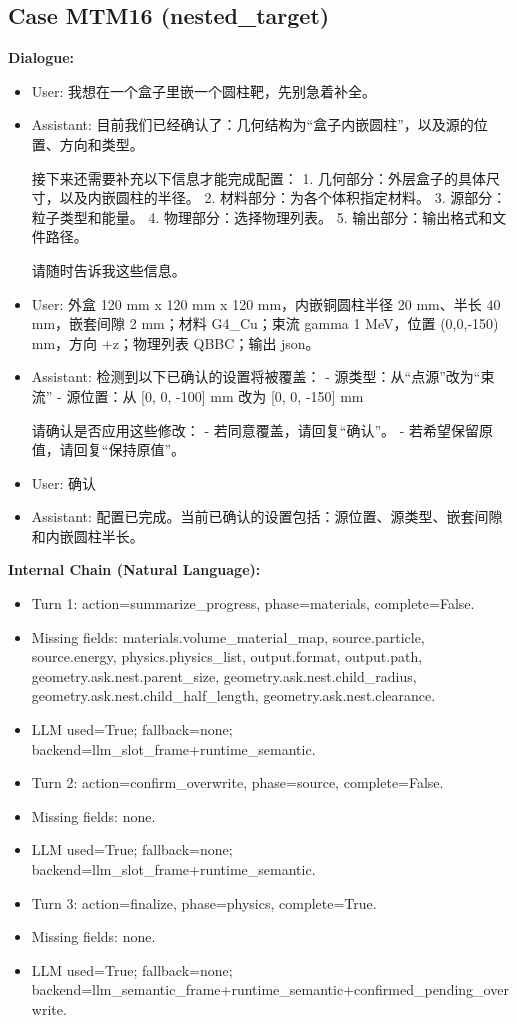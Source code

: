 \documentclass[11pt]{ctexart}
\begin{document}
\subsection{Case MTM16 (nested\_target)}
\textbf{Dialogue:}
\begin{itemize}
\item User: 我想在一个盒子里嵌一个圆柱靶，先别急着补全。
\item Assistant: 目前我们已经确认了：几何结构为“盒子内嵌圆柱”，以及源的位置、方向和类型。

接下来还需要补充以下信息才能完成配置：
1. 几何部分：外层盒子的具体尺寸，以及内嵌圆柱的半径。
2. 材料部分：为各个体积指定材料。
3. 源部分：粒子类型和能量。
4. 物理部分：选择物理列表。
5. 输出部分：输出格式和文件路径。

请随时告诉我这些信息。
\item User: 外盒 120 mm x 120 mm x 120 mm，内嵌铜圆柱半径 20 mm、半长 40 mm，嵌套间隙 2 mm；材料 G4\_Cu；束流 gamma 1 MeV，位置 (0,0,-150) mm，方向 +z；物理列表 QBBC；输出 json。
\item Assistant: 检测到以下已确认的设置将被覆盖：
- 源类型：从“点源”改为“束流”
- 源位置：从 [0, 0, -100] mm 改为 [0, 0, -150] mm

请确认是否应用这些修改：
- 若同意覆盖，请回复“确认”。
- 若希望保留原值，请回复“保持原值”。
\item User: 确认
\item Assistant: 配置已完成。当前已确认的设置包括：源位置、源类型、嵌套间隙和内嵌圆柱半长。
\end{itemize}
\textbf{Internal Chain (Natural Language):}
\begin{itemize}
\item Turn 1: action=summarize\_progress, phase=materials, complete=False.
\item Missing fields: materials.volume\_material\_map, source.particle, source.energy, physics.physics\_list, output.format, output.path, geometry.ask.nest.parent\_size, geometry.ask.nest.child\_radius, geometry.ask.nest.child\_half\_length, geometry.ask.nest.clearance.
\item LLM used=True; fallback=none; backend=llm\_slot\_frame+runtime\_semantic.
\item Turn 2: action=confirm\_overwrite, phase=source, complete=False.
\item Missing fields: none.
\item LLM used=True; fallback=none; backend=llm\_slot\_frame+runtime\_semantic.
\item Turn 3: action=finalize, phase=physics, complete=True.
\item Missing fields: none.
\item LLM used=True; fallback=none; backend=llm\_semantic\_frame+runtime\_semantic+confirmed\_pending\_overwrite.
\end{itemize}
\end{document}

